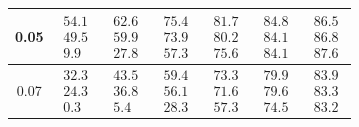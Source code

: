 \documentclass{article}
\begin{document}
\begin{table}[htbp]
\begin{tabular}{ccccccc}
0.05 &
$\begin{matrix}54.1\\49.5\\9.9\end{matrix}$ &
$\begin{matrix}62.6\\59.9\\27.8\end{matrix}$ &
$\begin{matrix}75.4\\73.9\\57.3\end{matrix}$ &
$\begin{matrix}81.7\\80.2\\75.6\end{matrix}$ &
$\begin{matrix}84.8\\84.1\\84.1\end{matrix}$ &
$\begin{matrix}86.5\\86.8\\87.6\end{matrix}$
\\[3pt]\hline

0.07 &
$\begin{matrix}32.3\\24.3\\0.3\end{matrix}$ &
$\begin{matrix}43.5\\36.8\\5.4\end{matrix}$ &
$\begin{matrix}59.4\\56.1\\28.3\end{matrix}$ &
$\begin{matrix}73.3\\71.6\\57.3\end{matrix}$ &
$\begin{matrix}79.9\\79.6\\74.5\end{matrix}$ &
$\begin{matrix}83.9\\83.3\\83.2\end{matrix}$
\\[3pt]\hline


\end{tabular}
\end{table}
\end{document}
